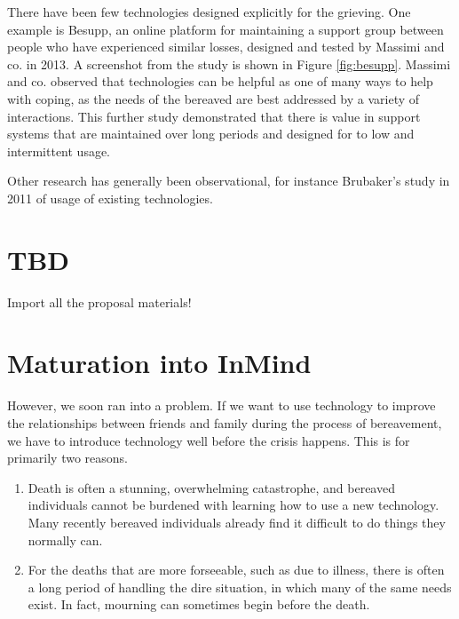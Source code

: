   There have been few technologies designed explicitly for the grieving. One
  example is Besupp, an online platform for maintaining a support group between
  people who have experienced similar losses, designed and tested by Massimi and
  co. in 2013. \cite{mm13}
  A screenshot from the study is shown in Figure \ref{fig:besupp}.
  Massimi and co. observed that technologies can be helpful as
  one of many ways to help with coping, as the needs of the bereaved are best
  addressed by a variety of interactions.
  This further study demonstrated that
  there is value in support systems that are maintained over long periods and
  designed for to low and intermittent usage.

  Other research has generally been observational, for instance Brubaker's study
  in 2011 of usage of existing technologies. \cite{brubaker11}

\section{TBD}
Import all the proposal materials!

\section{Maturation into InMind}
  However, we soon ran into a problem.
  If we want to use technology to improve the relationships between friends and family during the
  process of bereavement, we have to introduce technology well before the crisis happens.
  This is for primarily two reasons.
  \begin{enumerate}
  \item Death is often a stunning, overwhelming catastrophe,
  and bereaved individuals cannot be burdened with learning how to use a new technology.
  Many recently bereaved individuals already find it difficult to do things they normally can. \cite{??}
  \item For the deaths that are more forseeable, such as due to illness,
  there is often a long period of handling the dire situation,
  in which many of the same needs exist.
  In fact, mourning can sometimes begin before the death. \cite{??}
  \end{enumerate}

\clearpage
\newpage

